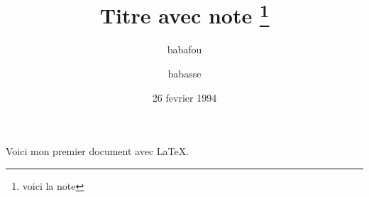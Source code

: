 \documentclass[a4paper,11pt]{article}
\author{babafou \and babasse}
\date{26 fevrier 1994}
\title{Titre avec note \thanks{voici la note}}
\begin{document}
\maketitle
Voici mon premier document avec \LaTeX.
\end{document}

